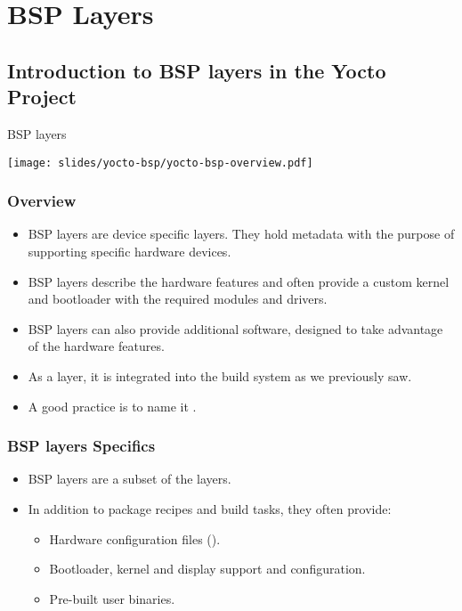 \section{BSP Layers}

\subsection{Introduction to BSP layers in the Yocto Project}

\begin{frame}{BSP layers}
  \begin{center}
    \texttt{[image: slides/yocto-bsp/yocto-bsp-overview.pdf]}
  \end{center}
\end{frame}

\begin{frame}
  \frametitle{Overview}
  \begin{itemize}
    \item BSP layers are device specific layers. They hold metadata
      with the purpose of supporting specific hardware devices.
    \item BSP layers describe the hardware features and often provide
      a custom kernel and bootloader with the required modules and
      drivers.
    \item BSP layers can also provide additional software, designed
      to take advantage of the hardware features.
    \item As a layer, it is integrated into the build system as we
      previously saw.
    \item A good practice is to name it .
  \end{itemize}
\end{frame}

\begin{frame}
  \frametitle{BSP layers Specifics}
  \begin{itemize}
    \item BSP layers are a subset of the layers.
    \item In addition to package recipes and build tasks, they often
      provide:
      \begin{itemize}
        \item Hardware configuration files ().
        \item Bootloader, kernel and display support and
          configuration.
        \item Pre-built user binaries.
      \end{itemize}
  \end{itemize}
\end{frame}

